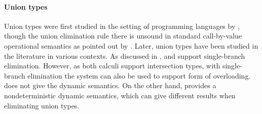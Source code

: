 \paragraph{Union types}
\begin{comment}
Set-theoretic unions have sound theory and extensively studied in
mathematics. Set-theoretic unions correspond to union types or
disjoint union types in programming languages. Disjoint union types
are also called sum types or variants.  Constructors are explicitly
labeled in disjoint union types and expressions are manipulated using
corresponding labels. Few other interesting calculi (and this paper)
do not use labels and provide type-based union elimination.
\end{comment}
Union types were first studied in the setting of programming languages by
\citet{macqueen1984ideal}, though the union elimination rule there is unsound in
standard call-by-value operational semantics as pointed out by
\cite{dunfield2003type}.
Later, union types have been studied in the literature in various
contexts. As discussed in ,
\citet{pierce1991programming} and \cite{dunfield2014elaborating} support
single-branch elimination. However, as both calculi support intersection types,
with single-branch elimination the system can also be used to support form of
overloading. \citet{pierce1991programming} does not give the dynamic semantics.
On the other hand, \cite{dunfield2014elaborating} provides
a nondeterministic dynamic semantics, which can give different
results when eliminating union types.
\begin{comment}
Moreover, while \citet{dunfield2014elaborating} shows that
subtyping is not necessary for elaboration, it is not obvious how to generalize
elaboration to support subtyping relations such as
\lstinline{Student <: Person} without using the subtyping rule. If the
elaboration were generalized further to support such a subtyping relation, then
a student with type \lstinline{Student | Person} can also be tagged
non-deterministically.
\end{comment}




